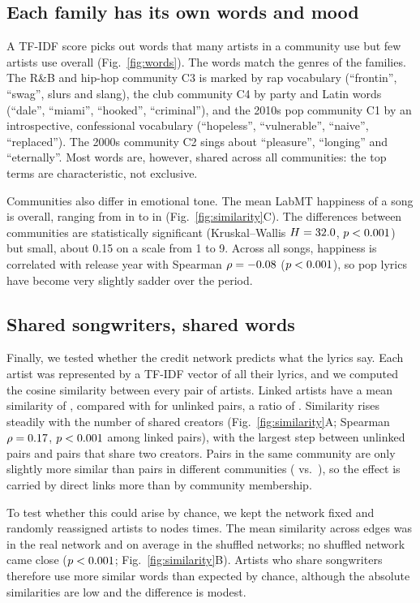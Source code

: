 \documentclass[9pt,twocolumn,twoside]{pnas-new}
\begin{document}
\subsection*{Each family has its own words and mood}
A TF-IDF score picks out words that many artists in a community use but few artists use overall (Fig.~\ref{fig:words}). The words match the genres of the families. The R\&B and hip-hop community C3 is marked by rap vocabulary (``frontin'', ``swag'', slurs and slang), the club community C4 by party and Latin words (``dale'', ``miami'', ``hooked'', ``criminal''), and the 2010s pop community C1 by an introspective, confessional vocabulary (``hopeless'', ``vulnerable'', ``naive'', ``replaced''). The 2000s community C2 sings about ``pleasure'', ``longing'' and ``eternally''. Most words are, however, shared across all communities: the top terms are characteristic, not exclusive.

Communities also differ in emotional tone. The mean LabMT happiness of a song is \HappyMean{} overall, ranging from \SaddestVal{} in \SaddestComm{} to \HappiestVal{} in \HappiestComm{} (Fig.~\ref{fig:similarity}C). The differences between communities are statistically significant (Kruskal--Wallis $H=32.0$, $p<0.001$) but small, about 0.15 on a scale from 1 to 9. Across all songs, happiness is correlated with release year with Spearman $\rho=-0.08$ ($p<0.001$), so pop lyrics have become very slightly sadder over the period.

\subsection*{Shared songwriters, shared words}
Finally, we tested whether the credit network predicts what the lyrics say. Each artist was represented by a TF-IDF vector of all their lyrics, and we computed the cosine similarity between every pair of artists. Linked artists have a mean similarity of \SimLinked, compared with \SimUnlinked{} for unlinked pairs, a ratio of \SimRatio. Similarity rises steadily with the number of shared creators (Fig.~\ref{fig:similarity}A; Spearman $\rho=0.17$, $p<0.001$ among linked pairs), with the largest step between unlinked pairs and pairs that share two creators. Pairs in the same community are only slightly more similar than pairs in different communities (\SimSameComm{} vs.\ \SimDiffComm), so the effect is carried by direct links more than by community membership.

To test whether this could arise by chance, we kept the network fixed and randomly reassigned artists to nodes \NumPerm{} times. The mean similarity across edges was \PermObserved{} in the real network and \PermNull{} on average in the shuffled networks; no shuffled network came close ($p<0.001$; Fig.~\ref{fig:similarity}B). Artists who share songwriters therefore use more similar words than expected by chance, although the absolute similarities are low and the difference is modest.
\end{document}
